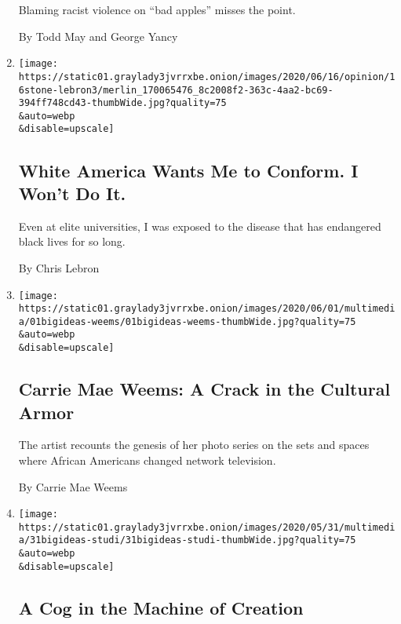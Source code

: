 \begin{enumerate}
  Blaming racist violence on ``bad apples'' misses the point.

  By Todd May and George Yancy
\item
  \href{/2020/06/16/opinion/black-academia-racism.html}{}

  \texttt{[image: https://static01.graylady3jvrrxbe.onion/images/2020/06/16/opinion/16stone-lebron3/merlin\_170065476\_8c2008f2-363c-4aa2-bc69-394ff748cd43-thumbWide.jpg?quality=75\\\&auto=webp\\\&disable=upscale]}

  \hypertarget{white-america-wants-me-to-conform-i-wont-do-it}{%
  \subsection{White America Wants Me to Conform. I Won't Do
  It.}\label{white-america-wants-me-to-conform-i-wont-do-it}}

  Even at elite universities, I was exposed to the disease that has
  endangered black lives for so long.

  By Chris Lebron
\item
  \href{/2020/06/01/opinion/carrie-mae-weems-black-television.html}{}

  \texttt{[image: https://static01.graylady3jvrrxbe.onion/images/2020/06/01/multimedia/01bigideas-weems/01bigideas-weems-thumbWide.jpg?quality=75\\\&auto=webp\\\&disable=upscale]}

  \hypertarget{carrie-mae-weems-a-crack-in-the-cultural-armor}{%
  \subsection{Carrie Mae Weems: A Crack in the Cultural
  Armor}\label{carrie-mae-weems-a-crack-in-the-cultural-armor}}

  The artist recounts the genesis of her photo series on the sets and
  spaces where African Americans changed network television.

  By Carrie Mae Weems
\item
  \href{/2020/05/31/opinion/acting-movies-art.html}{}

  \texttt{[image: https://static01.graylady3jvrrxbe.onion/images/2020/05/31/multimedia/31bigideas-studi/31bigideas-studi-thumbWide.jpg?quality=75\\\&auto=webp\\\&disable=upscale]}

  \hypertarget{a-cog-in-the-machine-of-creation}{%
  \subsection{A Cog in the Machine of
  Creation}\label{a-cog-in-the-machine-of-creation}}


\end{enumerate}
